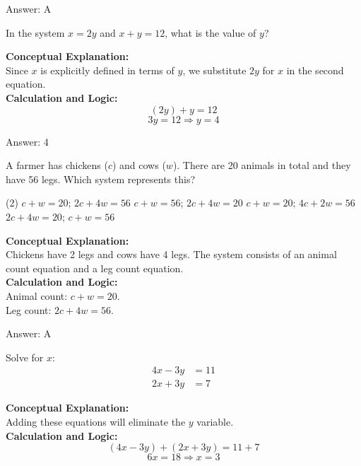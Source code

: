 \documentclass[11pt,paper=a4,answers]{exam}
\begin{document}
\begin{questions}
\begin{solution}
\vspace{15pt}
Answer: \colorbox{yellow!100}{A}
\end{solution}

\question
In the system $x = 2y$ and $x + y = 12$, what is the value of $y$?

\begin{solution}
\textbf{Conceptual Explanation:} \\
Since $x$ is explicitly defined in terms of $y$, we substitute $2y$ for $x$ in the second equation.
\\[10pt]
\textbf{Calculation and Logic:} \\
\[(2y) + y = 12\]
\[3y = 12 \Rightarrow y = 4\]

\vspace{15pt}
Answer: \colorbox{yellow!100}{4}
\end{solution}

\question
A farmer has chickens ($c$) and cows ($w$). There are 20 animals in total and they have 56 legs. Which system represents this?
\begin{tasks}(2)
    \task $c + w = 20$; $2c + 4w = 56$
    \task $c + w = 56$; $2c + 4w = 20$
    \task $c + w = 20$; $4c + 2w = 56$
    \task $2c + 4w = 20$; $c + w = 56$
\end{tasks}

\begin{solution}
\textbf{Conceptual Explanation:} \\
Chickens have 2 legs and cows have 4 legs. The system consists of an animal count equation and a leg count equation.
\\[10pt]
\textbf{Calculation and Logic:} \\
Animal count: $c + w = 20$. \\
Leg count: $2c + 4w = 56$.

\vspace{15pt}
Answer: \colorbox{yellow!100}{A}
\end{solution}

\question
Solve for $x$:
\begin{align*}
4x - 3y &= 11 \\
2x + 3y &= 7
\end{align*}

\begin{solution}
\textbf{Conceptual Explanation:} \\
Adding these equations will eliminate the $y$ variable.
\\[10pt]
\textbf{Calculation and Logic:} \\
\[(4x - 3y) + (2x + 3y) = 11 + 7\]
\[6x = 18 \Rightarrow x = 3\]


\end{solution}
\end{questions}
\end{document}
